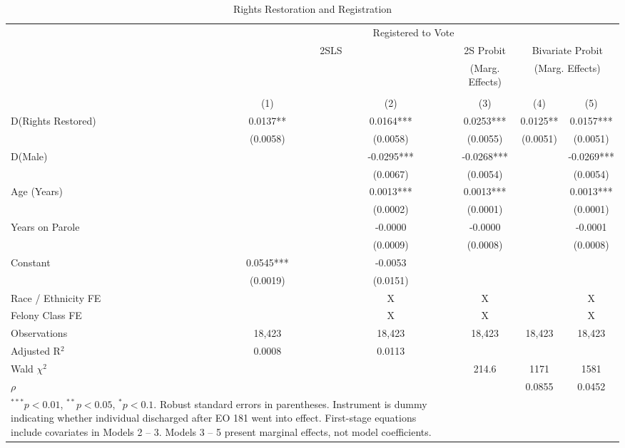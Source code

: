 \documentclass[
  12pt,
]{article}
\begin{document}
\begin{singlespace}
\begin{table}[H]
\caption{\label{tab:iv-models-chunk}\label{tab:iv-models} Rights Restoration and Registration}
\fontsize{10}{12}\selectfont
\centering

\begin{tabular}{lccccc}
\\[-1.8ex]\hline
& \multicolumn{5}{c}{Registered to Vote} \\
& \multicolumn{2}{c}{2SLS} & \multicolumn{1}{c}{2S Probit} &   \multicolumn{2}{c}{Bivariate Probit}\\
& & & \multicolumn{1}{c}{(Marg. Effects)} &   \multicolumn{2}{c}{(Marg. Effects)}\\
\cmidrule(l{3pt}r{3pt}){2-3} \cmidrule(l{3pt}r{3pt}){4-4} \cmidrule(l{3pt}r{3pt}){5-6}
\\[-1.8ex] & (1) & (2) & (3) & (4) & (5)\\
\hline
D(Rights Restored) & 0.0137** & 0.0164*** & 0.0253*** & 0.0125** & 0.0157*** \\
 & (0.0058) & (0.0058) & (0.0055) & (0.0051) & (0.0051) \\
D(Male) &  & -0.0295*** & -0.0268*** &  & -0.0269*** \\
 &  & (0.0067) & (0.0054) &  & (0.0054) \\
Age (Years) &  & 0.0013*** & 0.0013*** &  & 0.0013*** \\
 &  & (0.0002) & (0.0001) &  & (0.0001) \\
Years on Parole &  & -0.0000 & -0.0000 &  & -0.0001 \\
 &  & (0.0009) & (0.0008) &  & (0.0008) \\
Constant & 0.0545*** & -0.0053 &  &  &  \\
 & (0.0019) & (0.0151) &  &  &  \\
\hline
Race / Ethnicity FE &  & X & X &  & X \\
Felony Class FE &  & X & X &  & X \\
\hline
Observations & 18,423 & 18,423 & 18,423 & 18,423 & 18,423 \\
Adjusted R$^2$ & 0.0008 & 0.0113 &  &  &  \\
Wald $\chi^2$ &  &  & 214.6 & 1171 & 1581 \\
 $\rho$ &  &  &  & 0.0855 & 0.0452 \\
\hline
\multicolumn{3}{l}{\scriptsize{\parbox{.5\linewidth}{\vspace{2pt}$^{***}p<0.01$, $^{**}p<0.05$, $^*p<0.1$. \\
Robust standard errors in parentheses. \\
Instrument is dummy indicating whether \\
individual discharged after EO 181 went into effect. \\
First-stage equations include covariates in Models 2 -- 3. \\
Models 3 -- 5 present marginal effects, not model coefficients.}}}
\end{tabular}
\end{table}

\end{singlespace}
\end{document}
